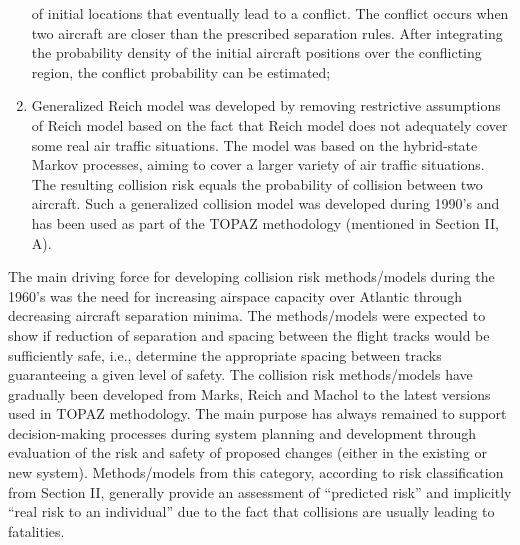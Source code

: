 \documentclass[a4paper, 10pt]{article}
\begin{document}
\begin{enumerate}
				of initial locations that eventually lead to a conflict. The
				conflict occurs when two aircraft are closer than the prescribed
				separation rules. After integrating the probability density of the
				initial aircraft positions over the conflicting region, the conflict
				probability can be estimated;
		\item Generalized Reich model was developed by removing
				restrictive assumptions of Reich model based on the fact that
				Reich model does not adequately cover some real air traffic
				situations. The model was based on the hybrid-state Markov
				processes, aiming to cover a larger variety of air traffic
				situations. The resulting collision risk equals the probability of
				collision between two aircraft. Such a generalized collision
				model was developed during 1990’s and has been used as part
				of the TOPAZ methodology (mentioned in Section II, A).
\end{enumerate}\par
The main driving force for developing collision risk
methods/models during the 1960’s was the need for increasing airspace capacity over Atlantic through decreasing aircraft
separation minima. The methods/models were expected to
show if reduction of separation and spacing between the flight
tracks would be sufficiently safe, i.e., determine the appropriate
spacing between tracks guaranteeing a given level of safety.
The collision risk methods/models have gradually been
developed from Marks, Reich and Machol to the latest versions
used in TOPAZ methodology. The main purpose has always
remained to support decision-making processes during system
planning and development through evaluation of the risk and
safety of proposed changes (either in the existing or new
system). Methods/models from this category, according to risk
classification from Section II, generally provide an assessment
of “predicted risk” and implicitly “real risk to an individual”
due to the fact that collisions are usually leading to fatalities.\par
\end{document}
